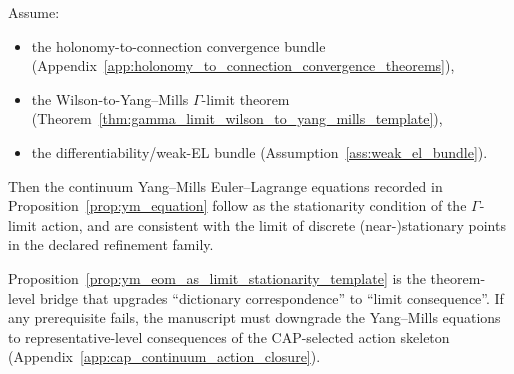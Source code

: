 \begin{proposition}
\label{prop:ym_eom_as_limit_stationarity_template}
\MathTag Assume:
\begin{itemize}
\item the holonomy-to-connection convergence bundle (Appendix~\ref{app:holonomy_to_connection_convergence_theorems}),
\item the Wilson-to-Yang--Mills $\Gamma$-limit theorem (Theorem~\ref{thm:gamma_limit_wilson_to_yang_mills_template}),
\item the differentiability/weak-EL bundle (Assumption~\ref{ass:weak_el_bundle}).
\end{itemize}
Then the continuum Yang--Mills Euler--Lagrange equations recorded in Proposition~\ref{prop:ym_equation} follow as the stationarity condition of the $\Gamma$-limit action, and are consistent with the limit of discrete (near-)stationary points in the declared refinement family.
\end{proposition}

\AuditTag Proposition~\ref{prop:ym_eom_as_limit_stationarity_template} is the theorem-level bridge that upgrades ``dictionary correspondence'' to ``limit consequence''.
If any prerequisite fails, the manuscript must downgrade the Yang--Mills equations to representative-level consequences of the CAP-selected action skeleton (Appendix~\ref{app:cap_continuum_action_closure}).


